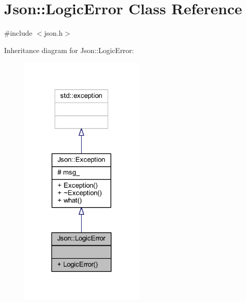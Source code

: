 \hypertarget{class_json_1_1_logic_error}{}\section{Json\+:\+:Logic\+Error Class Reference}
\label{class_json_1_1_logic_error}


{\ttfamily \#include $<$json.\+h$>$}



Inheritance diagram for Json\+:\+:Logic\+Error\+:\nopagebreak
\begin{figure}[H]
\begin{center}
\leavevmode
\includegraphics[width=167pt]{class_json_1_1_logic_error__inherit__graph}
\end{center}
\end{figure}


